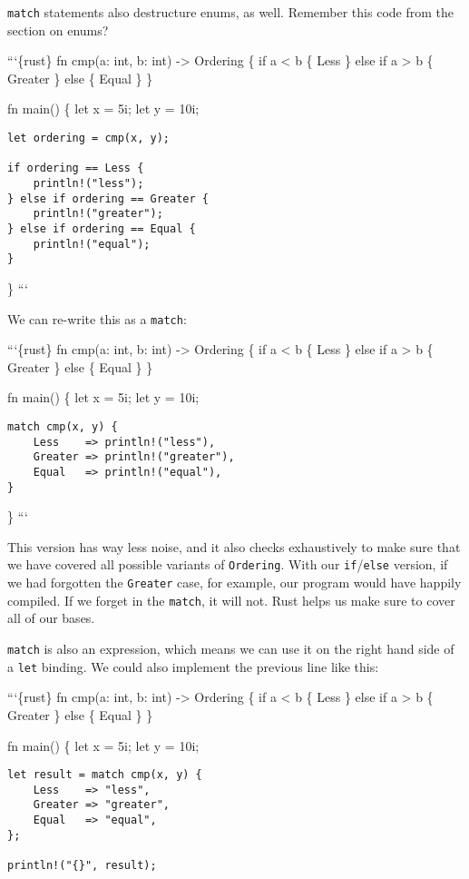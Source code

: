 \documentclass[]{article}
\begin{document}
\texttt{match} statements also destructure enums, as well. Remember this
code from the section on enums?

```\{rust\} fn cmp(a: int, b: int) -\textgreater{} Ordering \{ if a
\textless{} b \{ Less \} else if a \textgreater{} b \{ Greater \} else
\{ Equal \} \}

fn main() \{ let x = 5i; let y = 10i;

\begin{verbatim}
let ordering = cmp(x, y);

if ordering == Less {
    println!("less");
} else if ordering == Greater {
    println!("greater");
} else if ordering == Equal {
    println!("equal");
}
\end{verbatim}

\} ```

We can re-write this as a \texttt{match}:

```\{rust\} fn cmp(a: int, b: int) -\textgreater{} Ordering \{ if a
\textless{} b \{ Less \} else if a \textgreater{} b \{ Greater \} else
\{ Equal \} \}

fn main() \{ let x = 5i; let y = 10i;

\begin{verbatim}
match cmp(x, y) {
    Less    => println!("less"),
    Greater => println!("greater"),
    Equal   => println!("equal"),
}
\end{verbatim}

\} ```

This version has way less noise, and it also checks exhaustively to make
sure that we have covered all possible variants of \texttt{Ordering}.
With our \texttt{if}/\texttt{else} version, if we had forgotten the
\texttt{Greater} case, for example, our program would have happily
compiled. If we forget in the \texttt{match}, it will not. Rust helps us
make sure to cover all of our bases.

\texttt{match} is also an expression, which means we can use it on the
right hand side of a \texttt{let} binding. We could also implement the
previous line like this:

```\{rust\} fn cmp(a: int, b: int) -\textgreater{} Ordering \{ if a
\textless{} b \{ Less \} else if a \textgreater{} b \{ Greater \} else
\{ Equal \} \}

fn main() \{ let x = 5i; let y = 10i;

\begin{verbatim}
let result = match cmp(x, y) {
    Less    => "less",
    Greater => "greater",
    Equal   => "equal",
};

println!("{}", result);
\end{verbatim}
\end{document}
